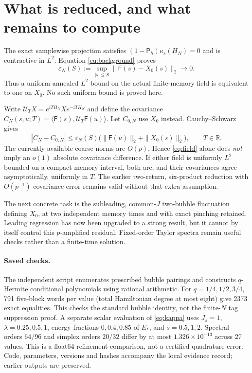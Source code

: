 \documentclass[11pt,a4paper]{article}
\newcommand{\PP}{\mathsf P_h}
\newcommand{\FF}{\mathsf F}
\begin{document}
\newpage
\section{What is reduced, and what remains to compute}
The exact samplewise projection satisfies
$(1-\PP)\kappa_s(H_N)=0$ and is contractive in $L^2$.
Equation \eqref{eq:background} proves
\begin{equation}
 \varepsilon_N(S):=\sup_{|s|\le S}\|\FF(s)-X_0(s)\|_2\to0.
 \label{eq:field}
\end{equation}
Thus a uniform annealed $L^2$ bound on the actual finite-memory
field is equivalent to one on $X_0$. No such uniform bound is
proved here.

Write $\mathcal U_TX=e^{iTH_N}Xe^{-iTH_N}$ and define the covariance
$C_N(s,u;T)=\langle\FF(s),\mathcal U_T\FF(u)\rangle$.
Let $C_{0,N}$ use $X_0$ instead. Cauchy--Schwarz gives
\begin{equation}
 |C_N-C_{0,N}|\le\varepsilon_N(S)
       \big(\|\FF(u)\|_2+\|X_0(s)\|_2\big),\qquad T\in\mathbb R.
\end{equation}
The currently available coarse norms are $O(p)$.
Hence \eqref{eq:field} alone does \emph{not} imply an $o(1)$
absolute covariance difference. If either field is uniformly
$L^2$ bounded on a compact memory interval, both are, and their
covariances agree asymptotically, uniformly in $T$.
The earlier two-return, six-product reduction with $O(p^{-1})$
covariance error remains valid without that extra assumption.

The next concrete task is the subleading, common-$J$ two-bubble
fluctuation defining $X_0$, at two independent memory times and
with exact pinching retained. Leading regression
has now been upgraded to a strong result, but it cannot by itself
control this $p$-amplified residual. Fixed-order Taylor spectra
remain useful checks rather than a finite-time solution.

\paragraph{Saved checks.}
The independent script enumerates prescribed bubble pairings and
constructs $q$-Hermite conditional polynomials using rational
arithmetic. For $q=1/4,1/2,3/4$, 791 five-block words per value
(total Hamiltonian degree at most eight) give 2373 exact equalities.
This checks the standard bubble identity, not the finite-$N$ tag
suppression proof. A separate scalar evaluation of \eqref{eq:kappa}
uses $J_s=1$, $\lambda=0.25,0.5,1$, energy fractions $0,0.4,0.85$
of $E_*$, and $s=0.5,1,2$. Spectral orders $64/96$ and simplex
orders $20/32$ differ by at most $1.326\times10^{-13}$ across 27
values. This is a float64 refinement comparison, not a certified
quadrature error. Code, parameters, versions and hashes accompany
the local evidence record; earlier outputs are preserved.
\end{document}
